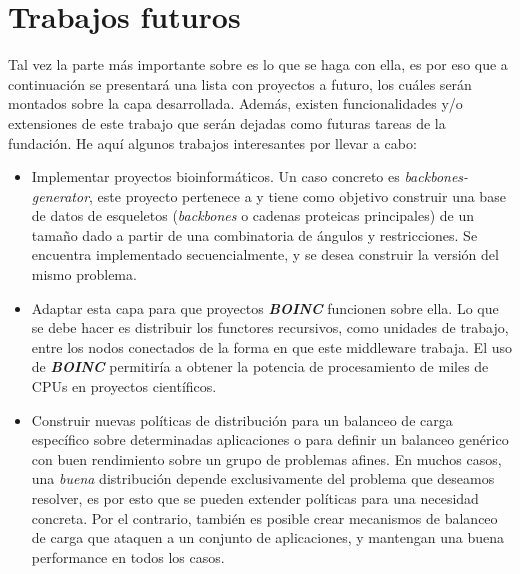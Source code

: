\chapter{Trabajos futuros}
\label{chap:future_work}

Tal vez la parte más importante sobre \rc{} es lo que se haga con ella, es por eso que a continuación se presentará una lista con proyectos
a futuro, los cuáles serán montados sobre la capa desarrollada. Además, existen funcionalidades y/o extensiones de este trabajo que serán
dejadas como futuras tareas de la fundación. He aquí algunos trabajos interesantes por llevar a cabo:
\begin{itemize}
    \item   Implementar proyectos bioinformáticos. Un caso concreto es \textit{backbones-generator}, este proyecto pertenece a \fude{} y
            tiene como objetivo construir una base de datos de esqueletos (\textit{backbones} o cadenas proteicas principales) de un tamaño
            dado a partir de una combinatoria de ángulos y restricciones. Se encuentra implementado secuencialmente, y se desea construir la
            versión \rc{} del mismo problema.
    \item   Adaptar esta capa para que proyectos \textbf{\textit{BOINC}} funcionen sobre ella. Lo que se debe hacer es distribuir los
            functores recursivos, como unidades de trabajo, entre los nodos conectados de la forma en que este middleware trabaja. El uso
            de \textbf{\textit{BOINC}} permitiría a \fude{} obtener la potencia de procesamiento de miles de CPUs en proyectos científicos.
    \item   Construir nuevas políticas de distribución para un balanceo de carga específico sobre determinadas aplicaciones o para
            definir un balanceo genérico con buen rendimiento sobre un grupo de problemas afines. En muchos casos, una \textit{buena}
            distribución depende exclusivamente del problema que deseamos resolver, es por esto que se pueden extender políticas para
            una necesidad concreta. Por el contrario, también es posible crear mecanismos de balanceo de carga que ataquen a un conjunto de
            aplicaciones, y mantengan una buena performance en todos los casos.
\end{itemize}
